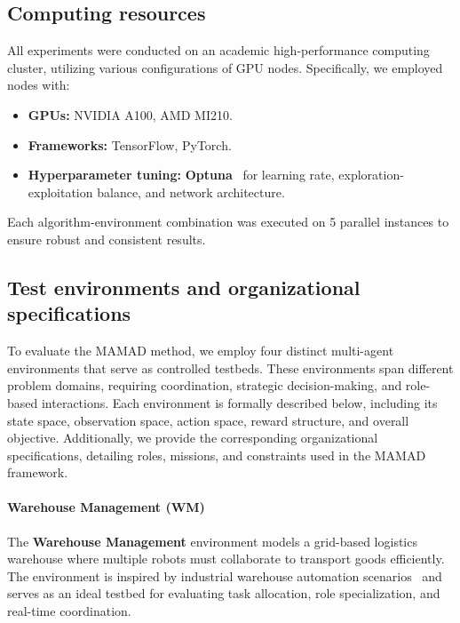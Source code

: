 \documentclass[pdflatex,sn-mathphys-num]{sn-jnl}%
\theoremstyle{thmstyleone}%
\theoremstyle{thmstyletwo}%
\theoremstyle{thmstylethree}%
\begin{document}
\subsection{Computing resources}

All experiments were conducted on an academic high-performance computing cluster, utilizing various configurations of GPU nodes. Specifically, we employed nodes with:
\begin{itemize}
    \item \textbf{GPUs:} NVIDIA A100, AMD MI210.
    \item \textbf{Frameworks:} TensorFlow, PyTorch.
    \item \textbf{Hyperparameter tuning:} \textbf{Optuna}~\cite{akiba2019optuna} for learning rate, exploration-exploitation balance, and network architecture.
\end{itemize}

Each algorithm-environment combination was executed on 5 parallel instances to ensure robust and consistent results.

\subsection{Test environments and organizational specifications}

To evaluate the MAMAD method, we employ four distinct multi-agent environments that serve as controlled testbeds. These environments span different problem domains, requiring coordination, strategic decision-making, and role-based interactions. Each environment is formally described below, including its state space, observation space, action space, reward structure, and overall objective. Additionally, we provide the corresponding organizational specifications, detailing roles, missions, and constraints used in the MAMAD framework.

\paragraph{Warehouse Management (WM)}
The \textbf{Warehouse Management} environment models a grid-based logistics warehouse where multiple robots must collaborate to transport goods efficiently. The environment is inspired by industrial warehouse automation scenarios~\cite{Wurman2008} and serves as an ideal testbed for evaluating task allocation, role specialization, and real-time coordination.
\end{document}
